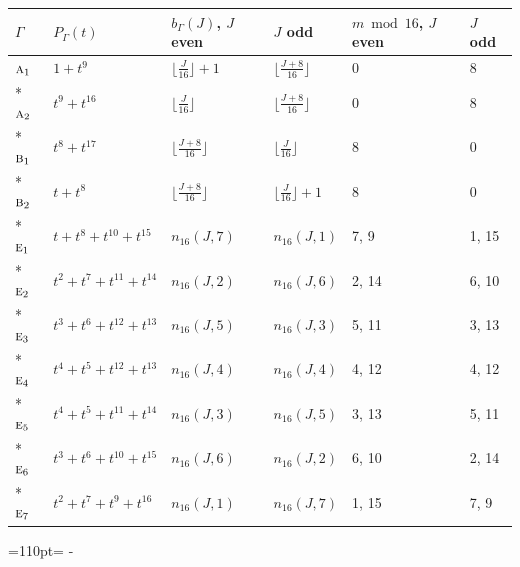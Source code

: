 \documentclass[10pt,a4paper]{article}
\newcommand{\needspace}[1]{\par\penalty-100\begingroup\dimen0=#1\relax\dimen2=\pagegoal
  \advance\dimen2-\pagetotal\ifdim\dimen0>\dimen2\relax\ifdim\dimen2>0pt\vfil\break\fi\fi
  \endgroup}
\numberwithin{equation}{section}
\newcommand{\irr}[1]{\text{\normalfont\scshape #1}}
\begin{document}
{\small{\renewcommand{\arraystretch}{1.3}\begin{longtable}{@{}llllll@{}}\toprule
$\Gamma$ & $P_\Gamma(t)$ & $b_\Gamma(J)$, $J$ even & $J$ odd & $m \bmod 16$, $J$ even & $J$ odd\\\midrule\endhead
\bottomrule\endfoot\endlastfoot
$\irr{a}_{1}$ & $1 + t^{9}$ & $\bigl\lfloor\tfrac{J}{16}\bigr\rfloor + 1$ & $\bigl\lfloor\tfrac{J+8}{16}\bigr\rfloor$ & 0 & 8\\*
$\irr{a}_{2}$ & $t^{9} + t^{16}$ & $\bigl\lfloor\tfrac{J}{16}\bigr\rfloor$ & $\bigl\lfloor\tfrac{J+8}{16}\bigr\rfloor$ & 0 & 8\\*
$\irr{b}_{1}$ & $t^{8} + t^{17}$ & $\bigl\lfloor\tfrac{J+8}{16}\bigr\rfloor$ & $\bigl\lfloor\tfrac{J}{16}\bigr\rfloor$ & 8 & 0\\*
$\irr{b}_{2}$ & $t + t^{8}$ & $\bigl\lfloor\tfrac{J+8}{16}\bigr\rfloor$ & $\bigl\lfloor\tfrac{J}{16}\bigr\rfloor + 1$ & 8 & 0\\*
$\irr{e}_{1}$ & $t + t^{8} + t^{10} + t^{15}$ & $n_{16}(J,7)$ & $n_{16}(J,1)$ & 7, 9 & 1, 15\\*
$\irr{e}_{2}$ & $t^{2} + t^{7} + t^{11} + t^{14}$ & $n_{16}(J,2)$ & $n_{16}(J,6)$ & 2, 14 & 6, 10\\*
$\irr{e}_{3}$ & $t^{3} + t^{6} + t^{12} + t^{13}$ & $n_{16}(J,5)$ & $n_{16}(J,3)$ & 5, 11 & 3, 13\\*
$\irr{e}_{4}$ & $t^{4} + t^{5} + t^{12} + t^{13}$ & $n_{16}(J,4)$ & $n_{16}(J,4)$ & 4, 12 & 4, 12\\*
$\irr{e}_{5}$ & $t^{4} + t^{5} + t^{11} + t^{14}$ & $n_{16}(J,3)$ & $n_{16}(J,5)$ & 3, 13 & 5, 11\\*
$\irr{e}_{6}$ & $t^{3} + t^{6} + t^{10} + t^{15}$ & $n_{16}(J,6)$ & $n_{16}(J,2)$ & 6, 10 & 2, 14\\*
$\irr{e}_{7}$ & $t^{2} + t^{7} + t^{9} + t^{16}$ & $n_{16}(J,1)$ & $n_{16}(J,7)$ & 1, 15 & 7, 9\\
\bottomrule\end{longtable}}}
\needspace{110pt}
\end{document}
